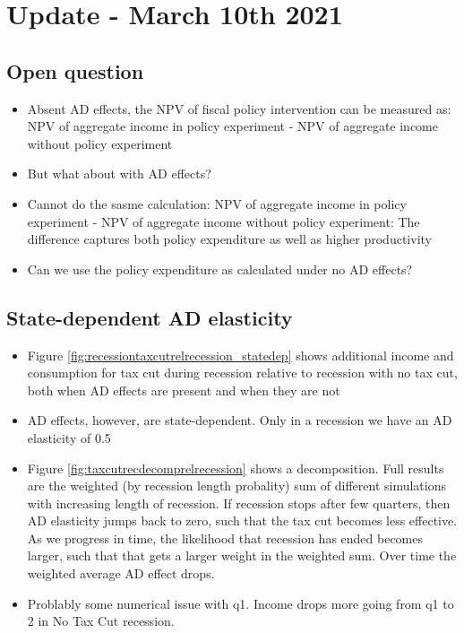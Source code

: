 \documentclass[]{article}
\begin{document}
\FloatBarrier
\section{Update - March 10th 2021}	

\FloatBarrier
\subsection{Open question}

\begin{itemize}
	\item Absent AD effects, the NPV of fiscal policy intervention can be measured as: NPV of aggregate income in policy experiment - NPV of aggregate income without policy experiment
	\item But what about with AD effects?
	\item Cannot do the sasme calculation: NPV of aggregate income in policy experiment - NPV of aggregate income without policy experiment: The difference captures both policy expenditure as well as higher productivity
	\item Can we use the policy expenditure as calculated under no AD effects?
\end{itemize}

\FloatBarrier
\subsection{State-dependent AD elasticity}

\begin{itemize}
	\item Figure \ref{fig:recessiontaxcutrelrecession_statedep} shows additional income and consumption for tax cut during recession relative to recession with no tax cut, both when AD effects are present and when they are not
	\item AD effects, however, are state-dependent. Only in a recession we have an AD elasticity of 0.5
	\item Figure \ref{fig:taxcutrecdecomprelrecession} shows a decomposition. Full results are the weighted (by recession length probality) sum of different simulations with increasing length of recession. If recession stops after few quarters, then AD elasticity jumps back to zero, such that the tax cut becomes less effective. As we progress in time, the likelihood that recession has ended becomes larger, such that that gets a larger weight in the weighted sum. Over time the weighted average AD effect drops.
	\item Problably some numerical issue with q1. Income drops more going from q1 to 2 in No Tax Cut recession.
\end{itemize}
\end{document}
